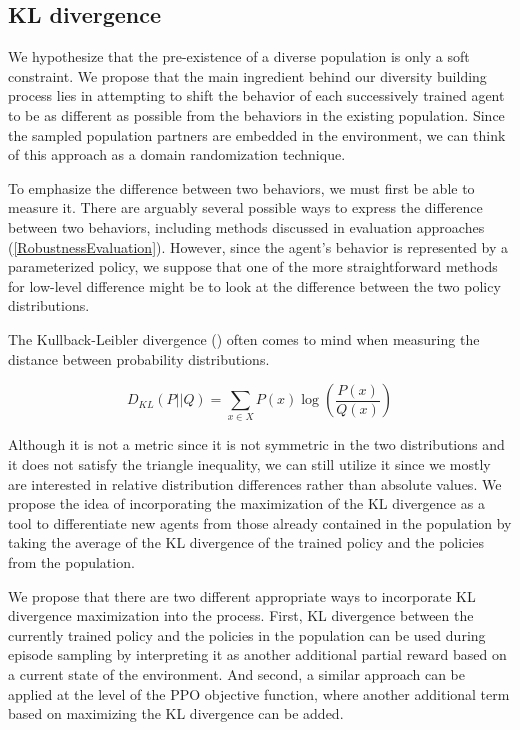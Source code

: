 \subsection{KL divergence}
We hypothesize that the pre-existence of a diverse population is only a soft constraint.
We propose that the main ingredient behind our diversity building process lies in attempting to shift the behavior of each successively trained agent to be as different as possible from the behaviors in the existing population.
Since the sampled population partners are embedded in the environment, we can think of this approach as a domain randomization technique.


To emphasize the difference between two behaviors, we must first be able to measure it.
There are arguably several possible ways to express the difference between two behaviors, including methods discussed in evaluation approaches (\ref{RobustnessEvaluation}).
However, since the agent's behavior is represented by a parameterized policy, we suppose that one of the more straightforward methods for low-level difference might be to look at the difference between the two policy distributions.

The Kullback-Leibler divergence (\cite{KLDivergence}) often comes to mind when measuring the distance between probability distributions.

\[
    D_{KL}(P||Q) = \sum_{x \in X}P(x)\log\left(\frac{P(x)}{Q(x)}\right)
\]

Although it is not a metric since it is not symmetric in the two distributions and it does not satisfy the triangle inequality, we can still utilize it since we mostly are interested in relative distribution differences rather than absolute values.
We propose the idea of incorporating the maximization of the KL divergence as a tool to differentiate new agents from those already contained in the population by taking the average of the KL divergence of the trained policy and the policies from the population.

We propose that there are two different appropriate ways to incorporate KL divergence maximization into the process.
First, KL divergence between the currently trained policy and the policies in the population can be used during episode sampling by interpreting it as another additional partial reward based on a current state of the environment.
And second, a similar approach can be applied at the level of the PPO objective function, where another additional term based on maximizing the KL divergence can be added.

